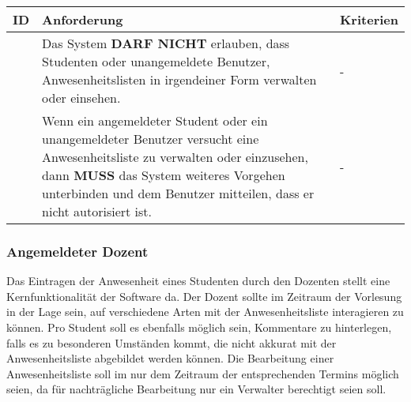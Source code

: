 \vspace{12pt}

\begin{tabular} {|p{}|p{}|p{}|}
	\hline
	ID & Anforderung & Kriterien \\
	\hline
	\printfreqnr
	& Das System \textbf{DARF NICHT} erlauben, dass Studenten oder unangemeldete Benutzer, Anwesenheitslisten in irgendeiner Form verwalten oder einsehen. 
	& - \\
	\hline
	\printfreqnr
	& Wenn ein angemeldeter Student oder ein unangemeldeter Benutzer versucht eine Anwesenheitsliste zu verwalten oder einzusehen, dann \textbf{MUSS} das System weiteres Vorgehen unterbinden und dem Benutzer mitteilen, dass er nicht autorisiert ist.
	& - \\ 
	\hline
\end{tabular}

\newpage

\subsubsection{Angemeldeter Dozent}
Das Eintragen der Anwesenheit eines Studenten durch den Dozenten stellt eine Kernfunktionalität der Software da. Der Dozent sollte im Zeitraum der Vorlesung in der Lage sein, auf verschiedene Arten mit der Anwesenheitsliste interagieren zu können. Pro Student soll es ebenfalls möglich sein, Kommentare zu hinterlegen, falls es zu besonderen Umständen kommt, die nicht akkurat mit der Anwesenheitsliste abgebildet werden können. Die Bearbeitung einer Anwesenheitsliste soll im nur dem Zeitraum der entsprechenden Termins möglich seien, da für nachträgliche Bearbeitung nur ein Verwalter berechtigt seien soll.
\vspace{12pt}


